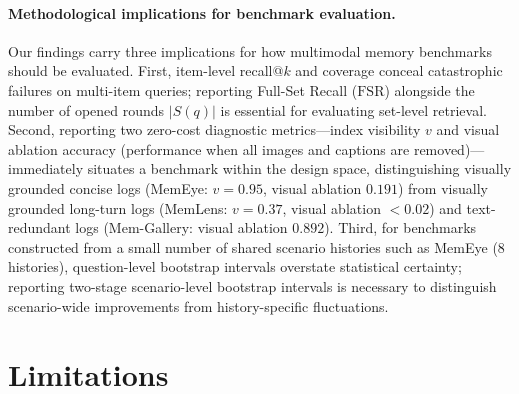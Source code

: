\documentclass[10pt]{article}
\begin{document}
\paragraph{Methodological implications for benchmark evaluation.} Our findings carry three implications for how multimodal memory benchmarks should be evaluated. First, item-level recall@$k$ and coverage conceal catastrophic failures on multi-item queries; reporting Full-Set Recall ($\mathrm{FSR}$) alongside the number of opened rounds $|S(q)|$ is essential for evaluating set-level retrieval. Second, reporting two zero-cost diagnostic metrics—index visibility $v$ and visual ablation accuracy (performance when all images and captions are removed)—immediately situates a benchmark within the design space, distinguishing visually grounded concise logs (MemEye: $v{=}0.95$, visual ablation $0.191$) from visually grounded long-turn logs (MemLens: $v{=}0.37$, visual ablation $<0.02$) and text-redundant logs (Mem-Gallery: visual ablation $0.892$). Third, for benchmarks constructed from a small number of shared scenario histories such as MemEye (8 histories), question-level bootstrap intervals overstate statistical certainty; reporting two-stage scenario-level bootstrap intervals is necessary to distinguish scenario-wide improvements from history-specific fluctuations.

\section{Limitations}
\label{sec:limitations}
\end{document}
